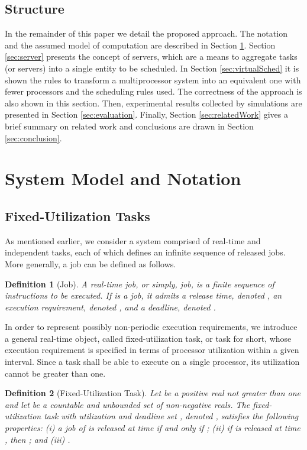 \documentclass[twocolumn, compsocconf]{IEEEtran}
\newtheorem{definition}{Definition}[section]
\newcounter{proc}
\begin{document}
\subsection{Structure}

In the remainder of this paper we detail the proposed approach. The notation and
the assumed model of computation are described in Section
\ref{sec:model}. Section \ref{sec:server} presents the concept of servers, which
are a means to aggregate tasks (or servers) into a single entity to be
scheduled. In Section \ref{sec:virtualSched} it is shown the rules to transform
a multiprocessor system into an equivalent one with fewer processors and the
scheduling rules used. The correctness of the approach is also shown in this
section. Then, experimental results collected by simulations are presented in
Section \ref{sec:evaluation}. Finally, Section \ref{sec:relatedWork} gives a
brief summary on related work and conclusions are drawn in Section
\ref{sec:conclusion}.


\section{System Model and Notation}\label{sec:model}

\subsection{Fixed-Utilization Tasks}\label{sec:fixedUtilTask}

As mentioned earlier, we consider a system comprised of  real-time and
independent tasks, each of which defines an infinite sequence of released
jobs. More generally, a job can be defined as follows.

\begin{definition}[Job]
  A real-time job, or simply, job, is a finite sequence of instructions to be
  executed. If  is a job, it admits a release time, denoted , an
  execution requirement, denoted , and a deadline, denoted .
\end{definition}

In order to represent possibly non-periodic execution requirements, we introduce
a general real-time object, called fixed-utilization task, or task for short,
whose execution requirement is specified in terms of processor utilization
within a given interval. Since a task shall be able to execute on a single
processor, its utilization cannot be greater than one.

\begin{definition}[Fixed-Utilization Task]\label{dfn:fixedUtilTask}
  Let  be a positive real not greater than one and let  be a countable and
  unbounded set of non-negative reals. The fixed-utilization task  with
  utilization  and deadline set , denoted , satisfies the
  following properties: (i) a job of  is released at time  if and only
  if ; (ii) if  is released at time , then ; and (iii) .
\end{definition}
\end{document}
